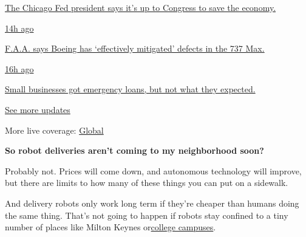 \href{https://www.nytimes3xbfgragh.onion/live/2020/08/03/business/stock-market-today-coronavirus?action=click\&pgtype=Article\&state=default\&region=MAIN_CONTENT_1\&context=storylines_live_updates\#the-chicago-fed-president-says-its-up-to-congress-to-save-the-economy}{The
Chicago Fed president says it's up to Congress to save the economy.}

\href{https://www.nytimes3xbfgragh.onion/live/2020/08/03/business/stock-market-today-coronavirus?action=click\&pgtype=Article\&state=default\&region=MAIN_CONTENT_1\&context=storylines_live_updates\#faa-says-boeing-has-effectively-mitigated-defects-in-the-737-max}{14h
ago}

\href{https://www.nytimes3xbfgragh.onion/live/2020/08/03/business/stock-market-today-coronavirus?action=click\&pgtype=Article\&state=default\&region=MAIN_CONTENT_1\&context=storylines_live_updates\#faa-says-boeing-has-effectively-mitigated-defects-in-the-737-max}{F.A.A.
says Boeing has `effectively mitigated' defects in the 737 Max.}

\href{https://www.nytimes3xbfgragh.onion/live/2020/08/03/business/stock-market-today-coronavirus?action=click\&pgtype=Article\&state=default\&region=MAIN_CONTENT_1\&context=storylines_live_updates\#small-businesses-got-emergency-loans-but-not-what-they-expected}{16h
ago}

\href{https://www.nytimes3xbfgragh.onion/live/2020/08/03/business/stock-market-today-coronavirus?action=click\&pgtype=Article\&state=default\&region=MAIN_CONTENT_1\&context=storylines_live_updates\#small-businesses-got-emergency-loans-but-not-what-they-expected}{Small
businesses got emergency loans, but not what they expected.}

\href{https://www.nytimes3xbfgragh.onion/live/2020/08/03/business/stock-market-today-coronavirus?action=click\&pgtype=Article\&state=default\&region=MAIN_CONTENT_1\&context=storylines_live_updates}{See
more updates}

More live coverage:
\href{https://www.nytimes3xbfgragh.onion/2020/08/04/world/coronavirus-covid-19.html?action=click\&pgtype=Article\&state=default\&region=MAIN_CONTENT_1\&context=storylines_live_updates}{Global}

\textbf{So robot deliveries aren't coming to my neighborhood soon?}

Probably not. Prices will come down, and autonomous technology will
improve, but there are limits to how many of these things you can put on
a sidewalk.

And delivery robots only work long term if they're cheaper than humans
doing the same thing. That's not going to happen if robots stay confined
to a tiny number of places like Milton Keynes
or\href{https://www.washingtonpost.com/technology/2019/03/25/how-gmu-students-eating-habits-changed-when-delivery-robots-invaded-their-campus/}{college
campuses}.

